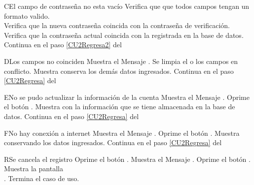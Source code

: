\begin{UCtrayectoriaA}{C}{El campo de contraseña no esta vacío}
    \UCpaso Verifica que que todos campos tengan un formato valido.
	    \\
	\UCpaso Verifica que la nueva contraseña coincida con la contraseña de verificación.
	    \\
	\UCpaso Verifica que la contraseña actual coincida con la registrada en la base de datos.
	    \\
	\UCpaso Continua en el paso \ref{CU2Regresa2} del 
\end{UCtrayectoriaA}

\begin{UCtrayectoriaA}{D}{Los campos no coinciden}
    \UCpaso Muestra el Mensaje \textbf{}.
    \UCpaso Se limpia el o los campos en conflicto.
    \UCpaso Muestra  conserva los demás datos ingresados.
	\UCpaso Continua en el paso \ref{CU2Regresa} del 
\end{UCtrayectoriaA}

\begin{UCtrayectoriaA}{E}{No se pudo actualizar la información de la cuenta}
    \UCpaso Muestra el Mensaje \textbf{}.
    \UCpaso[\UCactor] Oprime el botón .
    \UCpaso Muestra  con la información que se tiene almacenada en la base de datos.
    \UCpaso Continua en el paso \ref{CU2Regresa} del 
\end{UCtrayectoriaA}

\begin{UCtrayectoriaA}{F}{No hay conexión a internet}
    \UCpaso Muestra el Mensaje \textbf{}.
    \UCpaso[\UCactor] Oprime el botón .
    \UCpaso Muestra  conservando los datos ingresados.
    \UCpaso Continua en el paso \ref{CU2Regresa} del 
\end{UCtrayectoriaA}

\begin{UCtrayectoriaA}{R}{Se cancela el registro}
	\UCpaso[\UCactor] Oprime el botón .
	\UCpaso Muestra el Mensaje \textbf{}.
    \UCpaso[\UCactor] Oprime el botón . 
	\UCpaso Muestra la pantalla \\.
	\UCpaso Termina el caso de uso.
\end{UCtrayectoriaA}


